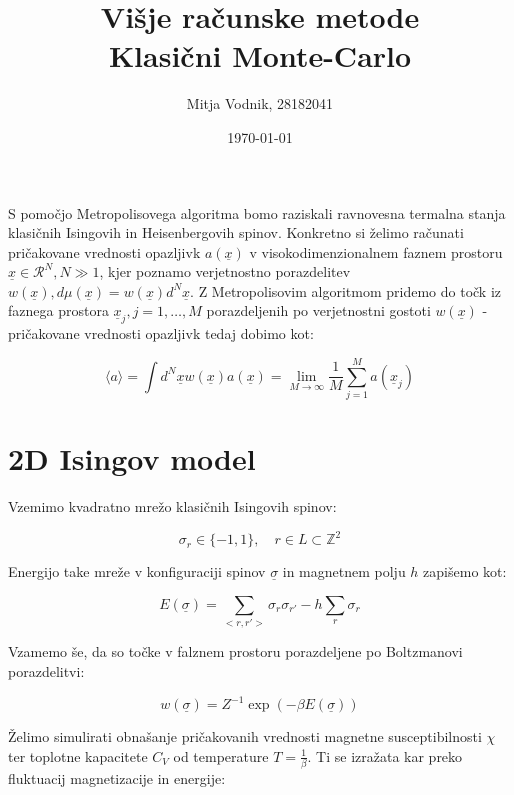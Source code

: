 \documentclass[a4paper]{article}
\newcommand{\x}{\underline{x}}
\newcommand{\s}{\sigma}
\newcommand{\us}{\underline{\s}}
\newcommand{\expected}[1]{\langle #1 \rangle}
\begin{document}
    \title{\sc\large Višje računske metode\\
		\bigskip
		\bf\Large Klasični Monte-Carlo}
	\author{Mitja Vodnik, 28182041}
	\date{\today}
	\maketitle

    S pomočjo Metropolisovega algoritma bomo raziskali ravnovesna termalna stanja klasičnih Isingovih in Heisenbergovih
    spinov.
    Konkretno si želimo računati pričakovane vrednosti opazljivk $a(\x)$ v visokodimenzionalnem faznem prostoru
    $\x \in \mathcal{R}^N, N \gg 1$, kjer poznamo verjetnostno porazdelitev $w(\x), d\mu(\x) = w(\x)d^N\x$.
    Z Metropolisovim algoritmom pridemo do točk iz faznega prostora $\x_j, j = 1, \ldots, M$ porazdeljenih po
    verjetnostni gostoti $w(\x)$ - pričakovane vrednosti opazljivk tedaj dobimo kot:

    \begin{equation}\label{eq1}
        \expected{a} = \int d^N\x w(\x) a(\x) = \lim_{M \to \infty} \frac{1}{M} \sum_{j=1}^M a(\x_j)
    \end{equation}

    \section{2D Isingov model}

    Vzemimo kvadratno mrežo klasičnih Isingovih spinov:

    \begin{equation}\label{eq2}
        \s_r \in \{ -1, 1 \}, \quad r \in L \subset \mathbb{Z}^2
    \end{equation}

    Energijo take mreže v konfiguraciji spinov $\us$ in magnetnem polju $h$ zapišemo kot:

    \begin{equation}\label{eq3}
        E(\us) = \sum_{<r, r'>} \s_r \s_{r'} - h\sum_r \s_r
    \end{equation}

    Vzamemo še, da so točke v falznem prostoru porazdeljene po Boltzmanovi porazdelitvi:

    \begin{equation}\label{eq4}
        w(\us) = Z^{-1}\exp(-\beta E(\us))
    \end{equation}

    Želimo simulirati obnašanje pričakovanih vrednosti magnetne susceptibilnosti $\chi$ ter toplotne kapacitete $C_V$
    od temperature $T = \frac{1}{\beta}$.
    Ti se izražata kar preko fluktuacij magnetizacije in energije:
\end{document}
